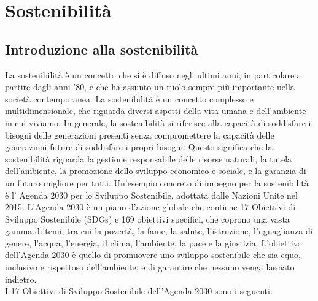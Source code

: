 \section{Sostenibilità}

\subsection{Introduzione alla sostenibilità}

La sostenibilità è un concetto che si è diffuso negli ultimi anni, in particolare a partire dagli anni '80, e che ha assunto un ruolo sempre più importante nella società contemporanea. La sostenibilità è un concetto complesso e multidimensionale, che riguarda diversi aspetti della vita umana e dell'ambiente in cui viviamo. In generale, la sostenibilità si riferisce alla capacità di soddisfare i bisogni delle generazioni presenti senza compromettere la capacità delle generazioni future di soddisfare i propri bisogni. Questo significa che la sostenibilità riguarda la gestione responsabile delle risorse naturali, la tutela dell'ambiente, la promozione dello sviluppo economico e sociale, e la garanzia di un futuro migliore per tutti.
Un'esempio concreto di impegno per la sostenibilità è l' Agenda 2030 per lo Sviluppo Sostenibile, adottata dalle Nazioni Unite nel 2015. L'Agenda 2030 è un piano d'azione globale che contiene 17 Obiettivi di Sviluppo Sostenibile (SDGs) e 169 obiettivi specifici, che coprono una vasta gamma di temi, tra cui la povertà, la fame, la salute, l'istruzione, l'uguaglianza di genere, l'acqua, l'energia, il clima, l'ambiente, la pace e la giustizia. L'obiettivo dell'Agenda 2030 è quello di promuovere uno sviluppo sostenibile che sia equo, inclusivo e rispettoso dell'ambiente, e di garantire che nessuno venga lasciato indietro.\\
I 17 Obiettivi di Sviluppo Sostenibile dell'Agenda 2030 sono i seguenti:
